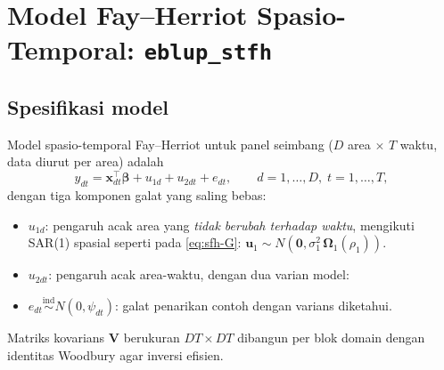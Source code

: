 \documentclass[11pt,a4paper]{article}
\theoremstyle{definition}
\begin{document}
\section{Model Fay--Herriot Spasio-Temporal: \texttt{eblup\_stfh}}

\subsection{Spesifikasi model}

Model spasio-temporal Fay--Herriot \cite{marhuenda2013} untuk panel seimbang
($D$ area $\times$ $T$ waktu, data diurut per area) adalah
\begin{equation}
  y_{dt} = \mathbf{x}_{dt}^{\top}\boldsymbol{\beta}
           + u_{1d} + u_{2dt} + e_{dt},
  \qquad d=1,\dots,D,\; t=1,\dots,T,
  \label{eq:stfh}
\end{equation}
dengan tiga komponen galat yang saling bebas:
\begin{itemize}[nosep]
  \item $u_{1d}$: pengaruh acak area yang \emph{tidak berubah terhadap waktu},
    mengikuti SAR(1) spasial seperti pada \eqref{eq:sfh-G}:
    $\mathbf{u}_1 \sim N(\mathbf{0}, \sigma_1^2\,\boldsymbol{\Omega}_1(\rho_1))$.
  \item $u_{2dt}$: pengaruh acak area-waktu, dengan dua varian model:
  \item $e_{dt} \overset{\text{ind}}{\sim} N(0, \psi_{dt})$: galat penarikan contoh
    dengan varians diketahui.
\end{itemize}
Matriks kovarians $\mathbf{V}$ berukuran $DT \times DT$ dibangun per blok domain
dengan identitas Woodbury agar inversi efisien.
\end{document}
